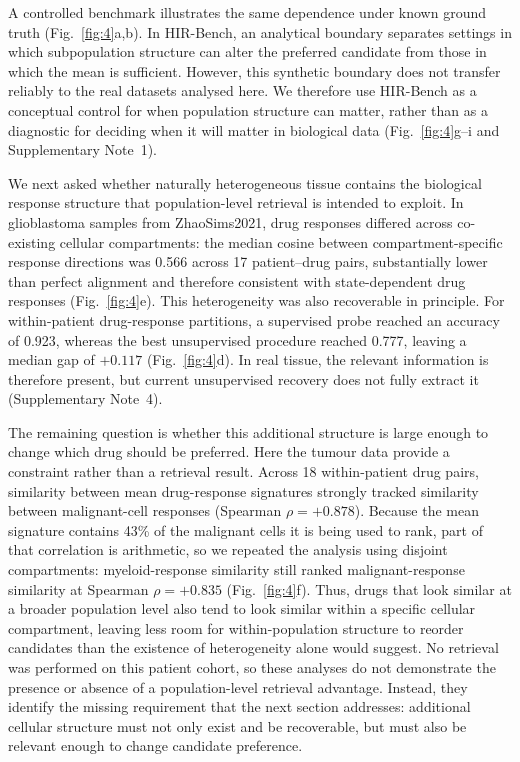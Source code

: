 \documentclass[11pt,letterpaper]{article}
\newcommand{\PREMISEOVERLAP}{+0.878}
\newcommand{\PREMISEDISJOINT}{+0.835}
\newcommand{\PREMISESHARE}{43\%}
\begin{document}
A controlled benchmark illustrates the same dependence under known ground truth (Fig.~\ref{fig:4}a,b). In HIR-Bench, an analytical boundary separates settings in which subpopulation structure can alter the preferred candidate from those in which the mean is sufficient. However, this synthetic boundary does not transfer reliably to the real datasets analysed here. We therefore use HIR-Bench as a conceptual control for when population structure can matter, rather than as a diagnostic for deciding when it will matter in biological data (Fig.~\ref{fig:4}g--i and Supplementary Note~1).

We next asked whether naturally heterogeneous tissue\cite{dataZhao} contains the biological response structure that population-level retrieval is intended to exploit. In glioblastoma samples from ZhaoSims2021, drug responses differed across co-existing cellular compartments: the median cosine between compartment-specific response directions was 0.566 across 17 patient--drug pairs, substantially lower than perfect alignment and therefore consistent with state-dependent drug responses (Fig.~\ref{fig:4}e). This heterogeneity was also recoverable in principle. For within-patient drug-response partitions, a supervised probe reached an accuracy of 0.923, whereas the best unsupervised procedure reached 0.777, leaving a median gap of $+0.117$ (Fig.~\ref{fig:4}d). In real tissue, the relevant information is therefore present, but current unsupervised recovery does not fully extract it (Supplementary Note~4).

The remaining question is whether this additional structure is large enough to change which drug should be preferred. Here the tumour data provide a constraint rather than a retrieval result. Across 18 within-patient drug pairs, similarity between mean drug-response signatures strongly tracked similarity between malignant-cell responses (Spearman $\rho=\PREMISEOVERLAP$). Because the mean signature contains \PREMISESHARE{} of the malignant cells it is being used to rank, part of that correlation is arithmetic, so we repeated the analysis using disjoint compartments: myeloid-response similarity still ranked malignant-response similarity at Spearman $\rho=\PREMISEDISJOINT$ (Fig.~\ref{fig:4}f). Thus, drugs that look similar at a broader population level also tend to look similar within a specific cellular compartment, leaving less room for within-population structure to reorder candidates than the existence of heterogeneity alone would suggest. No retrieval was performed on this patient cohort, so these analyses do not demonstrate the presence or absence of a population-level retrieval advantage. Instead, they identify the missing requirement that the next section addresses: additional cellular structure must not only exist and be recoverable, but must also be relevant enough to change candidate preference.
\end{document}
